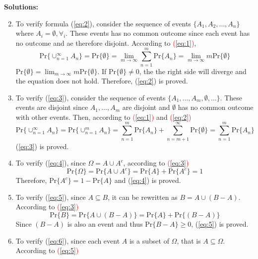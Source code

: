 \documentclass[UTF8]{article}
\begin{document}
    \textbf{Solutions:}
    \begin{enumerate}[1.]
        \setcounter{enumi}{1}
        \item To verify formula (\ref{eq:2}), consider the sequence of events $\{A_1,A_2,\dots,A_n\}$ where $A_i=\emptyset,\forall_i$. These events has no common outcome since each event has no outcome and ae therefore disjoint. According to \textcolor{red}{(\ref{eq:1})},
        \begin{equation*}
            \text{Pr}\{\cup^\infty_{n=1}A_n\}=\text{Pr}\{\emptyset\}=\lim_{m\rightarrow\infty}\sum^m_{n=1}\text{Pr}\{A_n\}=\lim_{m\rightarrow\infty}m\text{Pr}\{\emptyset\}
        \end{equation*}
        $\text{Pr}\{\emptyset\}=\lim_{m\rightarrow\infty}m\text{Pr}\{\emptyset\}$. If $\text{Pr}\{\emptyset\}\neq0$, the the right side will diverge and the equation does not hold. Therefore, (\ref{eq:2}) is proved.
        \item To verify (\ref{eq:3}), consider the sequence of events $\{A_1,\dots,A_m,\emptyset,\dots\}$. These events are disjoint since $A_1,\dots,A_m$ are disjoint and $\emptyset$ has no common outcome with other events. Then, according to \textcolor{red}{(\ref{eq:1})} and \textcolor{red}{(\ref{eq:2})} 
        \begin{equation*}
            \text{Pr}\{\cup^\infty_{n=1}A_n\}=\text{Pr}\{\cup^m_{n=1}A_n\}=\sum^m_{n=1}\text{Pr}\{A_n\}+\sum^\infty_{n=m+1}\text{Pr}\{\emptyset\}=\sum^m_{n=1}\text{Pr}\{A_n\}
        \end{equation*}
        (\ref{eq:3}) is proved.
        \item To verify (\ref{eq:4}), since $\Omega=A\cup A^c$, according to \textcolor{red}{(\ref{eq:3})}
        \begin{equation*}
            \text{Pr}\{\Omega\}=\text{Pr}\{A\cup A^c\}=\text{Pr}\{A\}+\text{Pr}\{A^c\}=1
        \end{equation*}
        Therefore, $\text{Pr}\{A^c\}=1-\text{Pr}\{A\}$ and (\ref{eq:4}) is proved.
        \item To verify (\ref{eq:5}), since $A\subseteq B$, it can be rewritten as $B=A\cup(B-A)$. According to \textcolor{red}{(\ref{eq:3})}
        \begin{equation*}
            \text{Pr}\{B\}=\text{Pr}\{A\cup(B-A)\}=\text{Pr}\{A\}+\text{Pr}\{(B-A)\}
        \end{equation*}
        Since $(B-A)$ is also an event and thus $\text{Pr}\{B-A\}\geq 0$, (\ref{eq:5}) is proved.
        \item To verify (\ref{eq:6}), since each event $A$ is a subset of $\Omega$, that is $A\subseteq\Omega$. According to \textcolor{red}{(\ref{eq:5})}

\end{enumerate}
\end{document}
